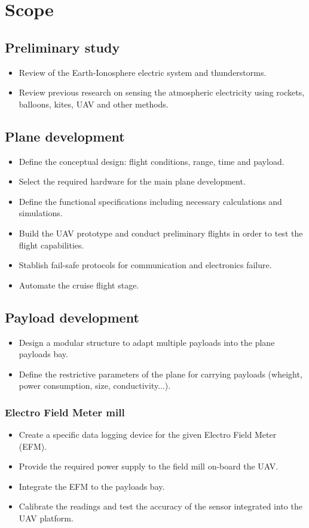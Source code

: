 \chapter{Scope}
\section{Preliminary study}
\begin{itemize}
	\item Review of the Earth-Ionosphere electric system and thunderstorms.
	\item Review previous research on sensing the atmospheric electricity using rockets, balloons, kites, UAV and other methods.
\end{itemize}
\section{Plane development}
\begin{itemize}
	\item Define the conceptual design: flight conditions, range, time and payload.
	\item Select the required hardware for the main plane development.
	\item Define the functional specifications including necessary calculations and simulations.
	\item Build the UAV prototype and conduct preliminary flights in order to test the flight capabilities.
	\item Stablish fail-safe protocols for communication and electronics failure.
	\item Automate the cruise flight stage.
\end{itemize}
\section{Payload development}
\begin{itemize}
	\item Design a modular structure to adapt multiple payloads into the plane payloads bay.
	\item Define the restrictive parameters of the plane for carrying payloads (wheight, power consumption, size, conductivity...).
\end{itemize}
\subsection{Electro Field Meter mill}
\begin{itemize}
	\item Create a specific data logging device for the given Electro Field Meter (EFM).
	\item Provide the required power supply to the field mill on-board the UAV. 
	\item Integrate the EFM to the payloads bay.
	\item Calibrate the readings and test the accuracy of the sensor integrated into the UAV platform.
\end{itemize}
